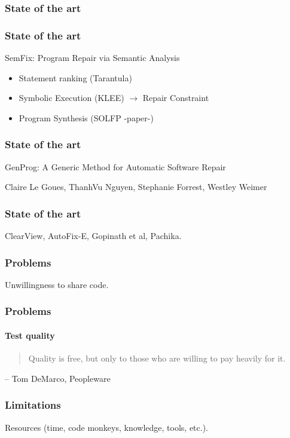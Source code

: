 \documentclass{beamer}
\begin{document}
{
%
  \frame
  {
    \frametitle{State of the art}
  }
}

  \frame
  {
    \frametitle{State of the art}
    SemFix: Program Repair via Semantic Analysis
\begin{itemize}
\item Statement ranking (Tarantula)
\item Symbolic Execution (KLEE) $\rightarrow$ Repair Constraint
\item Program Synthesis (SOLFP -paper-)
\end{itemize}
 }


  \frame
  {
    \frametitle{State of the art}
    GenProg: A Generic Method for Automatic Software Repair
    
Claire Le Goues, ThanhVu Nguyen, Stephanie Forrest, Westley Weimer
  }

  \frame
  {
    \frametitle{State of the art}
    ClearView, AutoFix-E, Gopinath et al, Pachika.
  }

  \frame
  {
    \frametitle{Problems}
    Unwillingness to share code.
  }

  \frame
  {
    \frametitle{Problems}
    \framesubtitle{Test quality}
   \begin{quote}
    Quality is free, but only to those who are willing to pay heavily for it.
   \end{quote}
   – Tom DeMarco, Peopleware
   
   
%    
%    
%    
%    
   
  }
 
  \frame
  {
    \frametitle{Limitations}
    Resources (time, code monkeys, knowledge, tools, etc.).
  }
\end{document}
